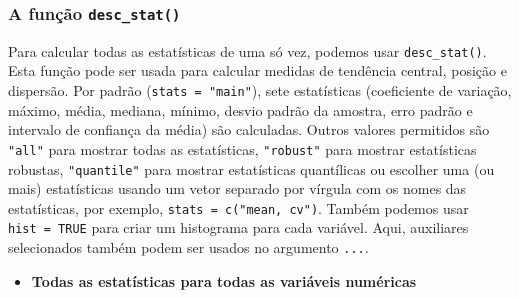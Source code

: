 \documentclass[
]{book}
\makeatletter
\providecommand{\tightlist}{%
  \setlength{\itemsep}{0pt}\setlength{\parskip}{0pt}}
\numberwithin{equation}{section}
\newcommand{\indf}[1]{\index[function]{#1@\texttt{#1()}|ST}}
\makeatother
\begin{document}
\hypertarget{a-funuxe7uxe3o-desc_stat}{%
\subsubsection{\texorpdfstring{A função \texttt{desc\_stat()}}{A função desc\_stat()}}\label{a-funuxe7uxe3o-desc_stat}}

Para calcular todas as estatísticas de uma só vez, podemos usar \texttt{desc\_stat()}\indf{desc\_stat}. Esta função pode ser usada para calcular medidas de tendência central, posição e dispersão. Por padrão (\texttt{stats\ =\ "main"}), sete estatísticas (coeficiente de variação, máximo, média, mediana, mínimo, desvio padrão da amostra, erro padrão e intervalo de confiança da média) são calculadas. Outros valores permitidos são \texttt{"all"} para mostrar todas as estatísticas, \texttt{"robust"} para mostrar estatísticas robustas, \texttt{"quantile"} para mostrar estatísticas quantílicas ou escolher uma (ou mais) estatísticas usando um vetor separado por vírgula com os nomes das estatísticas, por exemplo, \texttt{stats\ =\ c("mean,\ cv")}. Também podemos usar \texttt{hist\ =\ TRUE} para criar um histograma para cada variável. Aqui, auxiliares selecionados também podem ser usados no argumento \texttt{...}.

\begin{itemize}
\tightlist
\item
  \textbf{Todas as estatísticas para todas as variáveis numéricas}
\end{itemize}
\end{document}
